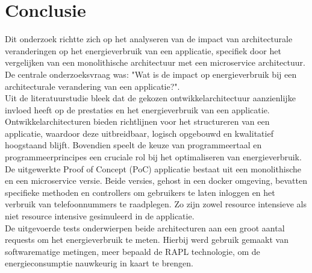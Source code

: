 
\chapter{Conclusie}%
\label{ch:conclusie}


Dit onderzoek richtte zich op het analyseren van de impact van architecturale veranderingen op het energieverbruik van een applicatie, specifiek door het vergelijken van een monolithische architectuur met een microservice architectuur. De centrale onderzoeksvraag was: "Wat is de impact op energieverbruik bij een architecturale verandering van een applicatie?".\\

Uit de literatuurstudie bleek dat de gekozen ontwikkelarchitectuur aanzienlijke invloed heeft op de prestaties en het energieverbruik van een applicatie. Ontwikkelarchitecturen bieden richtlijnen voor het structureren van een applicatie, waardoor deze uitbreidbaar, logisch opgebouwd en kwalitatief hoogstaand blijft. Bovendien speelt de keuze van programmeertaal en programmeerprincipes een cruciale rol bij het optimaliseren van energieverbruik.\\

De uitgewerkte Proof of Concept (PoC) applicatie bestaat uit een monolithische en een microservice versie. Beide versies, gehost in een docker omgeving, bevatten specifieke methoden en controllers om gebruikers te laten inloggen en het verbruik van telefoonnummers te raadplegen. Zo zijn zowel resource intensieve als niet resource intensive gesimuleerd in de applicatie.\\

De uitgevoerde tests onderwierpen beide architecturen aan een groot aantal requests om het energieverbruik te meten. Hierbij werd gebruik gemaakt van softwarematige metingen, meer bepaald de RAPL technologie, om de energieconsumptie nauwkeurig in kaart te brengen.\\

